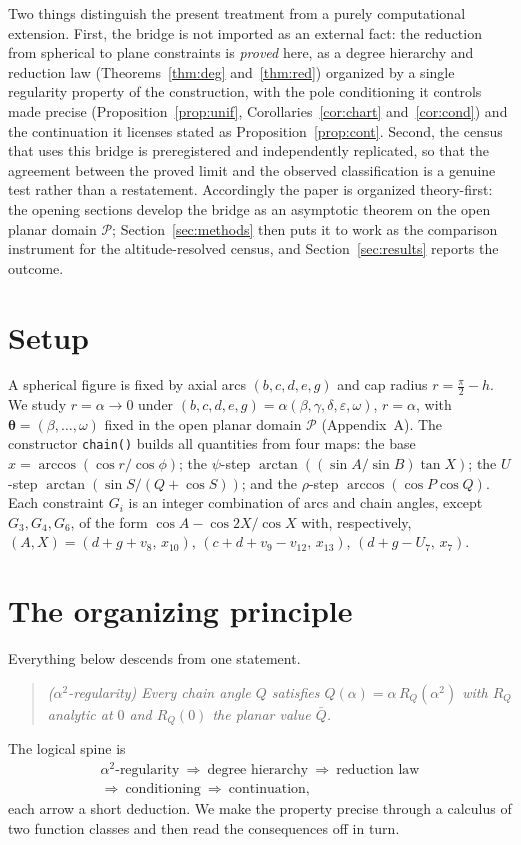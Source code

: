 \documentclass[pdflatex,sn-mathphys-num]{sn-jnl}
\theoremstyle{thmstyleone}%
\theoremstyle{thmstyletwo}%
\theoremstyle{thmstylethree}%
\begin{document}
Two things distinguish the present treatment from a purely computational extension. First, the bridge is not imported as an external fact: the reduction from spherical to plane constraints is \emph{proved} here, as a degree hierarchy and reduction law (Theorems~\ref{thm:deg} and~\ref{thm:red}) organized by a single regularity property of the construction, with the pole conditioning it controls made precise (Proposition~\ref{prop:unif}, Corollaries~\ref{cor:chart} and~\ref{cor:cond}) and the continuation it licenses stated as Proposition~\ref{prop:cont}. Second, the census that uses this bridge is preregistered and independently replicated, so that the agreement between the proved limit and the observed classification is a genuine test rather than a restatement. Accordingly the paper is organized theory-first: the opening sections develop the bridge as an asymptotic theorem on the open planar domain $\mathcal P$; Section~\ref{sec:methods} then puts it to work as the comparison instrument for the altitude-resolved census, and Section~\ref{sec:results} reports the outcome.

\section{Setup}
A spherical figure is fixed by axial arcs $(b,c,d,e,g)$ and cap radius
$r=\tfrac\pi2-h$. We study $r=\alpha\to0$ under $(b,c,d,e,g)=\alpha(\beta,\gamma,\delta,\varepsilon,\omega)$, $r=\alpha$, with $\boldsymbol\theta=(\beta,\dots,\omega)$ fixed in the open planar domain $\mathcal P$ (Appendix~A). The constructor \texttt{chain()} builds all quantities from four maps: the base $x=\arccos(\cos r/\cos\phi)$; the $\psi$-step $\arctan((\sin A/\sin B)\tan X)$; the $U$-step $\arctan(\sin S/(Q+\cos S))$; and the $\rho$-step $\arccos(\cos P\cos Q)$. Each constraint $G_i$ is an integer combination of arcs and chain angles, except $G_3,G_4,G_6$, of the form $\cos A-\cos2X/\cos X$ with, respectively, $(A,X)=(d{+}g{+}v_8,\,x_{10})$, $(c{+}d{+}v_9{-}v_{12},\,x_{13})$, $(d{+}g{-}U_7,\,x_7)$.

\section{The organizing principle}
Everything below descends from one statement.
\begin{quote}\itshape
($\alpha^2$-regularity) Every chain angle $Q$ satisfies $Q(\alpha)=\alpha\,R_Q(\alpha^2)$
with $R_Q$ analytic at $0$ and $R_Q(0)$ the planar value $\bar Q$.
\end{quote}
The logical spine is
\[
\begin{gathered}
\text{$\alpha^2$-regularity}\ \Rightarrow\ \text{degree hierarchy}\ \Rightarrow\
\text{reduction law}\\
\Rightarrow\ \text{conditioning}\ \Rightarrow\ \text{continuation,}
\end{gathered}
\]
each arrow a short deduction. We make the property precise through a calculus of two function classes and then read the consequences off in turn.
\end{document}
